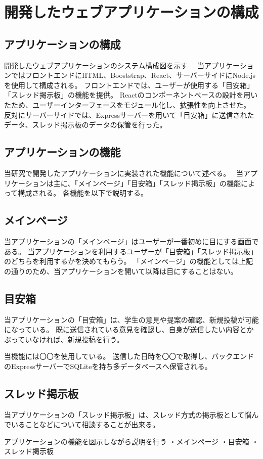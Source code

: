 \documentclass[main]{subfiles}
\begin{document}
\chapter{開発したウェブアプリケーションの構成}
\label{cha:overview}
\section{アプリケーションの構成}

開発したウェブアプリケーションのシステム構成図を示す　%
当アプリケーションではフロントエンドにHTML、Booststrap、React、サーバーサイドにNode.jsを使用して構成される。
フロントエンドでは、ユーザーが使用する「目安箱」「スレッド掲示板」の機能を提供。
Reactのコンポーネントベースの設計を用いたため、ユーザーインターフェースをモジュール化し、拡張性を向上させた。
反対にサーバーサイドでは、Expressサーバーを用いて「目安箱」に送信されたデータ、スレッド掲示板のデータの保管を行った。

\section{アプリケーションの機能}
当研究で開発したアプリケーションに実装された機能について述べる。　%
当アプリケーションは主に、「メインページ」「目安箱」「スレッド掲示板」の機能によって構成される。
各機能を以下で説明する。

\section{メインページ}

当アプリケーションの「メインページ」はユーザーが一番初めに目にする画面である。
当アプリケーションを利用するユーザーが「目安箱」「スレッド掲示板」のどちらを利用するかを決めてもらう。
「メインページ」の機能としては上記の通りのため、当アプリケーションを開いて以降は目にすることはない。

\section{目安箱}

当アプリケーションの「目安箱」は、学生の意見や提案の確認、新規投稿が可能になっている。
既に送信されている意見を確認し、自身が送信したい内容とかぶっていなければ、新規投稿を行う。

当機能には〇〇を使用している。
送信した日時を〇〇で取得し、バックエンドのExpressサーバーでSQLiteを持ち多データベースへ保管される。

\section{スレッド掲示板}

当アプリケーションの「スレッド掲示板」は、スレッド方式の掲示板として悩んでいることなどについて相談することが出来る。


アプリケーションの機能を図示しながら説明を行う
・メインページ
・目安箱
・スレッド掲示板
\end{document}
